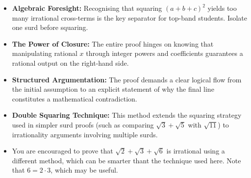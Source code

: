 \begin{takeaways}
\begin{itemize}
\item \textbf{Algebraic Foresight:} Recognising that squaring $(a + b + c)^2$ yields too many irrational cross-terms is the key separator for top-band students. Isolate one surd before squaring.
\item \textbf{The Power of Closure:} The entire proof hinges on knowing that manipulating rational $x$ through integer powers and coefficients guarantees a rational output on the right-hand side.
\item \textbf{Structured Argumentation:} The proof demands a clear logical flow from the initial assumption to an explicit statement of why the final line constitutes a mathematical contradiction.
\item \textbf{Double Squaring Technique:} This method extends the squaring strategy used in simpler surd proofs (such as comparing $\sqrt{3} + \sqrt{5}$ with $\sqrt{11}$) to irrationality arguments involving multiple surds.
\item You are encouraged to prove that $\sqrt{2} + \sqrt{3} + \sqrt{6}$ is irrational using a different method, which can be smarter thant the technique used here. Note that $6 = 2 \cdot 3$, which may be useful.
\end{itemize}
\end{takeaways}
